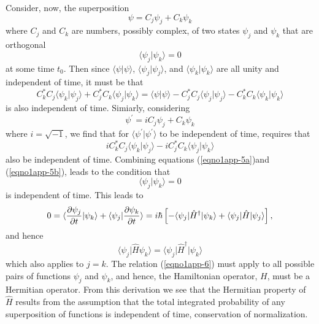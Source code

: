 Consider, now, the superposition
\begin{equation}
\psi = C_j \psi_j + C_k \psi_k
\end{equation}
where $C_j$ and $C_k$ are numbers, possibly complex, of two states 
$\psi_j$ and $\psi_k$ that are orthogonal
\begin{equation}
\langle \psi_j \vert \psi_k \rangle = 0
\end{equation}
at some time $t_0$. Then since $ \langle \psi \vert \psi\rangle$,
$\langle \psi_j \vert \psi_j \rangle$, and $\langle \psi_k \vert
\psi_k \rangle$ are all unity and independent of time, it must be that
\begin{equation}
C ^*_k  C_j \langle \psi_k \vert \psi_j\rangle 
+ C ^*_j C_k \langle \psi_j \vert \psi_k \rangle 
= \langle \psi \vert \psi \rangle
- C ^*_j C_j \langle \psi_j \vert \psi_j \rangle 
- C ^*_k C_k \langle \psi_k \vert \psi_k \rangle
\label{eqno1app-5a}
\end{equation}
is also independent of time.  Simiarly, considering
\begin{equation}
\psi^{\prime} = i C_j \psi_j + C_k \psi_k
\end{equation}
where $i = \sqrt{-1}$, we find that for $\langle \psi^{\prime} \vert 
\psi^{\prime} \rangle$ to be independent of time, requires that
\begin{equation}
iC_k ^* C_j \langle \psi_k \vert \psi_j \rangle - iC_j ^* C_k \langle \psi_j \vert 
\psi_k \rangle
\label{eqno1app-5b}
\end{equation}
also be independent of time. Combining equations
(\ref{eqno1app-5a})and (\ref{eqno1app-5b}), leads to the condition that
\begin{equation}
\langle \psi_j \vert \psi_k \rangle = 0
\end{equation}
is independent of time. This leads to
\begin{equation}
0 = \langle {\partial \psi_j \over \partial t} \vert \psi_k \rangle + 
\langle \psi_j \vert {\partial \psi_k \over \partial t} \rangle = i 
\hbar \left[ - \langle \psi_j \vert {\hat H}^{\dag} \vert \psi_k \rangle + \langle 
\psi_j \vert {\hat H} \vert \psi_j \rangle \right],
\end{equation}
and hence
\begin{equation}
\langle \psi_j \vert {\hat H} \psi_k \rangle = \langle \psi_j \vert {\hat H}^{\dag} 
\vert \psi_k \rangle
\label{eqno1app-6}
\end{equation}
which also applies to $j = k$.  The relation (\ref{eqno1app-6}) must
apply to all possible pairs of functions $\psi_j$ and $\psi_k$, and
hence, the Hamiltonian operator, $H$, must be a Hermitian
operator. From this derivation we see that the Hermitian property of
${\hat H}$ results from the assumption that the total integrated
probability of any superposition of functions is independent of time,
conservation of normalization.

